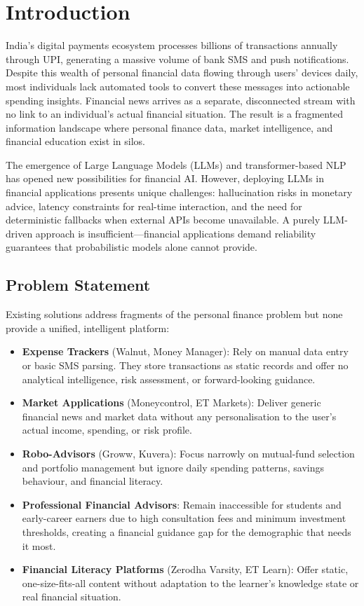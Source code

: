\documentclass[conference]{IEEEtran}
\begin{document}
\section{Introduction}

India's digital payments ecosystem processes billions of transactions annually through UPI, generating a massive volume of bank SMS and push notifications. Despite this wealth of personal financial data flowing through users' devices daily, most individuals lack automated tools to convert these messages into actionable spending insights. Financial news arrives as a separate, disconnected stream with no link to an individual's actual financial situation. The result is a fragmented information landscape where personal finance data, market intelligence, and financial education exist in silos.

The emergence of Large Language Models (LLMs) and transformer-based NLP has opened new possibilities for financial AI. However, deploying LLMs in financial applications presents unique challenges: hallucination risks in monetary advice, latency constraints for real-time interaction, and the need for deterministic fallbacks when external APIs become unavailable. A purely LLM-driven approach is insufficient---financial applications demand reliability guarantees that probabilistic models alone cannot provide.

\subsection{Problem Statement}

Existing solutions address fragments of the personal finance problem but none provide a unified, intelligent platform:

\begin{itemize}[leftmargin=*]
  \item \textbf{Expense Trackers} (Walnut, Money Manager): Rely on manual data entry or basic SMS parsing. They store transactions as static records and offer no analytical intelligence, risk assessment, or forward-looking guidance.
  \item \textbf{Market Applications} (Moneycontrol, ET Markets): Deliver generic financial news and market data without any personalisation to the user's actual income, spending, or risk profile.
  \item \textbf{Robo-Advisors} (Groww, Kuvera): Focus narrowly on mutual-fund selection and portfolio management but ignore daily spending patterns, savings behaviour, and financial literacy.
  \item \textbf{Professional Financial Advisors}: Remain inaccessible for students and early-career earners due to high consultation fees and minimum investment thresholds, creating a financial guidance gap for the demographic that needs it most.
  \item \textbf{Financial Literacy Platforms} (Zerodha Varsity, ET Learn): Offer static, one-size-fits-all content without adaptation to the learner's knowledge state or real financial situation.
\end{itemize}
\end{document}
